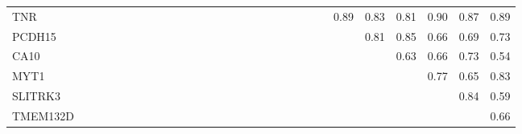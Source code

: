 \begin{longtable}{lrrrrrrrrrrrrrrrrrrrrrrrrrrrr}
TNR      &              &            &            &               &              &             &              &               &             &              &              &             &              &             &             &            &              &              &               &             &              &           &         0.89 &       0.83 &       0.81 &          0.90 &           0.87 &        0.89 \\
PCDH15   &              &            &            &               &              &             &              &               &             &              &              &             &              &             &             &            &              &              &               &             &              &           &              &       0.81 &       0.85 &          0.66 &           0.69 &        0.73 \\
CA10     &              &            &            &               &              &             &              &               &             &              &              &             &              &             &             &            &              &              &               &             &              &           &              &            &       0.63 &          0.66 &           0.73 &        0.54 \\
MYT1     &              &            &            &               &              &             &              &               &             &              &              &             &              &             &             &            &              &              &               &             &              &           &              &            &            &          0.77 &           0.65 &        0.83 \\
SLITRK3  &              &            &            &               &              &             &              &               &             &              &              &             &              &             &             &            &              &              &               &             &              &           &              &            &            &               &           0.84 &        0.59 \\
TMEM132D &              &            &            &               &              &             &              &               &             &              &              &             &              &             &             &            &              &              &               &             &              &           &              &            &            &               &                &        0.66 \\
\end{longtable}


